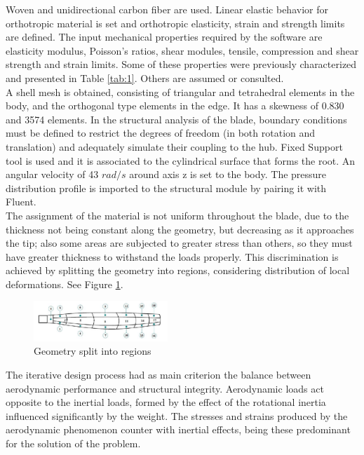 Woven and unidirectional carbon fiber are used. Linear elastic behavior for orthotropic material is set and orthotropic elasticity, strain and strength limits are defined. The input mechanical properties required by the software are elasticity modulus, Poisson's ratios, shear modules, tensile, compression and shear strength and strain limits. Some of these properties were previously characterized and presented in Table \ref{tab:1}. Others are assumed or consulted.\\
 
A shell mesh is obtained, consisting of triangular and tetrahedral elements in the body, and the orthogonal type elements in the edge. It has a skewness of 0.830 and 3574 elements. In the structural analysis of the blade, boundary conditions must be defined to restrict the degrees of freedom (in both rotation and translation) and adequately simulate their coupling to the hub. Fixed Support tool is used and it is associated to the cylindrical surface that forms the root. An angular velocity of 43 $rad / s$ around axis z is set to the body. The pressure distribution profile is imported to the structural module by pairing it with Fluent.\\

The assignment of the material is not uniform throughout the blade, due to the thickness not being constant along the geometry, but decreasing as it approaches the tip; also some areas are subjected to greater stress than others, so they must have greater thickness to withstand the loads properly. This discrimination is achieved by splitting the geometry into regions, considering distribution of local deformations. See Figure \ref{fig:8}.

\begin{figure}[H]
\begin{center}
  \includegraphics[width=0.45\textwidth]{p1}
\caption{Geometry split into regions }
\label{fig:8}       %
\end{center}
\end{figure}

The iterative design process had as main criterion the balance between aerodynamic performance and structural integrity. Aerodynamic loads act opposite to the inertial loads, formed by the effect of the rotational inertia influenced significantly by the weight. The stresses and strains produced by the aerodynamic phenomenon counter with inertial effects, being these predominant for the solution of the problem.\\

